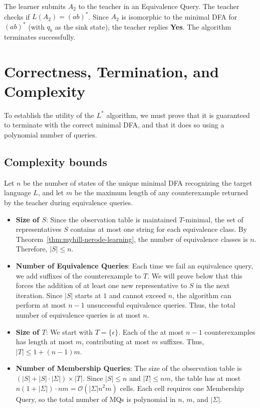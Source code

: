 The learner submits $A_2$ to the teacher in an Equivalence Query. The teacher checks if $L(A_2) = (ab)^*$. Since $A_2$ is isomorphic to the minimal DFA for $(ab)^*$ (with $q_b$ as the sink state), the teacher replies \textbf{Yes}. The algorithm terminates successfully.

\section{Correctness, Termination, and Complexity}
\label{sec:lstar-correctness}

To establish the utility of the $L^*$ algorithm, we must prove that it is guaranteed to terminate with the correct minimal DFA, and that it does so using a polynomial number of queries.

\subsection{Complexity bounds}

Let $n$ be the number of states of the unique minimal DFA recognizing the target language $L$, and let $m$ be the maximum length of any counterexample returned by the teacher during equivalence queries.

\begin{itemize}
  \item \textbf{Size of $S$}: Since the observation table is maintained $T$-minimal, the set of representatives $S$ contains at most one string for each equivalence class. By Theorem~\ref{thm:myhill-nerode-learning}, the number of equivalence classes is $n$. Therefore, $|S| \le n$.
  \item \textbf{Number of Equivalence Queries}: Each time we fail an equivalence query, we add suffixes of the counterexample to $T$. We will prove below that this forces the addition of at least one new representative to $S$ in the next iteration. Since $|S|$ starts at $1$ and cannot exceed $n$, the algorithm can perform at most $n-1$ unsuccessful equivalence queries. Thus, the total number of equivalence queries is at most $n$.
  \item \textbf{Size of $T$}: We start with $T = \{\epsilon\}$. Each of the at most $n-1$ counterexamples has length at most $m$, contributing at most $m$ suffixes. Thus, $|T| \le 1 + (n-1)m$.
  \item \textbf{Number of Membership Queries}: The size of the observation table is $(|S| + |S| \cdot |\Sigma|) \times |T|$. Since $|S| \le n$ and $|T| \le nm$, the table has at most $n(1 + |\Sigma|) \cdot nm = \mathcal{O}(|\Sigma| n^2 m)$ cells. Each cell requires one Membership Query, so the total number of MQs is polynomial in $n$, $m$, and $|\Sigma|$.
\end{itemize}

